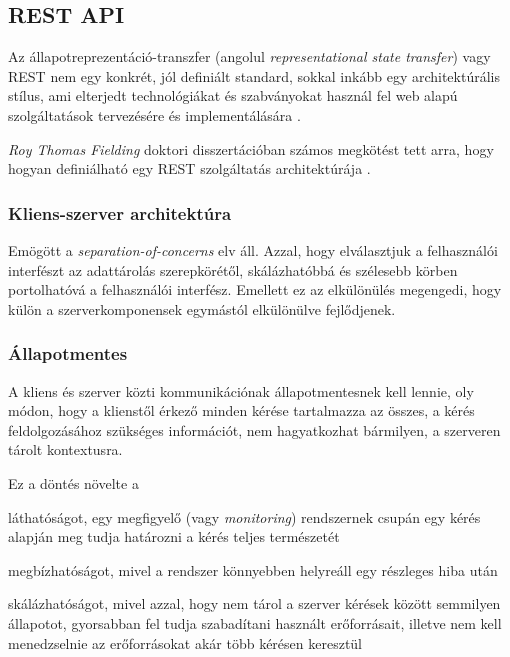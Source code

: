 \subsection{REST API}

Az állapotreprezentáció-transzfer (angolul \emph{representational state transfer}) vagy REST nem egy konkrét, jól definiált standard, sokkal inkább egy architektúrális stílus, ami elterjedt technológiákat és szabványokat használ fel web alapú szolgáltatások tervezésére és implementálására \cite{richards2006representational}. \par

\emph{Roy Thomas Fielding} doktori disszertációban számos megkötést tett arra, hogy hogyan definiálható egy REST szolgáltatás architektúrája \cite{fielding2000architectural}. 

\subsubsection{Kliens-szerver architektúra}
Emögött a \emph{separation-of-concerns} elv áll. Azzal, hogy elválasztjuk a felhasználói interfészt az adattárolás szerepkörétől, skálázhatóbbá és szélesebb körben portolhatóvá a felhasználói interfész. Emellett ez az elkülönülés megengedi, hogy külön a szerverkomponensek egymástól elkülönülve fejlődjenek.

\subsubsection{Állapotmentes}
A kliens és szerver közti kommunikációnak állapotmentesnek kell lennie, oly módon, hogy a klienstől érkező minden kérése tartalmazza az összes, a kérés feldolgozásához szükséges információt, nem hagyatkozhat bármilyen, a szerveren tárolt kontextusra. \par

Ez a döntés növelte a 
\begin{listing}
	\item láthatóságot, egy megfigyelő (vagy \emph{monitoring}) rendszernek csupán egy kérés alapján meg tudja határozni a kérés teljes természetét
	\item megbízhatóságot, mivel a rendszer könnyebben helyreáll egy részleges hiba után
	\item skálázhatóságot, mivel azzal, hogy nem tárol a szerver kérések között semmilyen állapotot, gyorsabban fel tudja szabadítani használt erőforrásait, illetve nem kell menedzselnie az erőforrásokat akár több kérésen keresztül
\end{listing}

